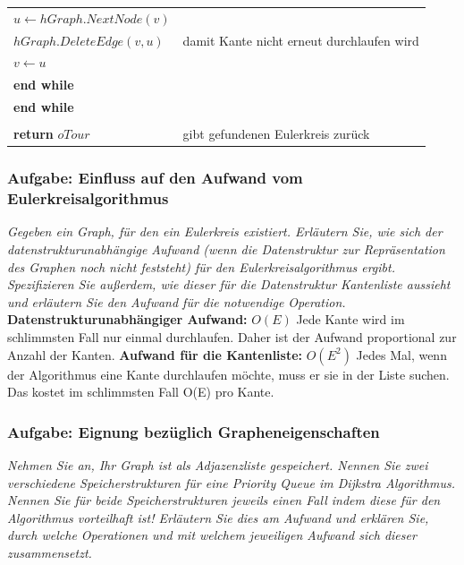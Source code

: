 \documentclass{article}
\begin{document}
\begin{algorithm}[H]
\begin{table}[H]
\begin{tabular}{p{6cm} p{9cm}}
        \setlength\parindent{24pt} $u \gets hGraph.NextNode(v)$ & \\
        \setlength\parindent{24pt} $hGraph.DeleteEdge(v, u)$ & damit Kante nicht erneut durchlaufen wird \\
        \setlength\parindent{24pt} $v \gets u$  & \\
        \setlength\parindent{12pt} \textbf{end while} & \\
        \textbf{end while} & \\
        & \\
        \textbf{return} $oTour$ & gibt gefundenen Eulerkreis zurück \\
    \end{tabular}
    \label{tab:Hierholzer-Algorithmus} 
\end{table}
\end{algorithm}


\newpage
\subsubsection{Aufgabe: Einfluss auf den Aufwand vom Eulerkreisalgorithmus \textcolor{ForestGreen}{\CheckmarkBold}}
\textit{Gegeben ein Graph, für den ein Eulerkreis existiert. Erläutern Sie, wie sich der datenstrukturunabhängige Aufwand (wenn die Datenstruktur zur Repräsentation des Graphen noch nicht feststeht) für den Eulerkreisalgorithmus  ergibt. Spezifizieren Sie außerdem, wie dieser für die Datenstruktur Kantenliste aussieht und erläutern Sie den Aufwand für die notwendige Operation.}\cite{hauptklausur21} \newline \newline 
\textbf{Datenstrukturunabhängiger Aufwand:} $O(E)$ \newline
Jede Kante wird im schlimmsten Fall nur einmal durchlaufen. Daher ist der Aufwand proportional zur Anzahl der Kanten. \newline
\textbf{Aufwand für die Kantenliste:} $O(E^2)$ \newline
Jedes Mal, wenn der Algorithmus eine Kante durchlaufen möchte, muss er sie in der Liste suchen. Das kostet im schlimmsten Fall O(E) pro Kante.
\newpage
\subsubsection{Aufgabe: Eignung bezüglich Grapheneigenschaften \textcolor{ForestGreen}{\CheckmarkBold}}
\textit{Nehmen Sie an, Ihr Graph ist als Adjazenzliste  gespeichert. Nennen Sie zwei verschiedene Speicherstrukturen für eine Priority Queue im Dijkstra Algorithmus. Nennen Sie für beide Speicherstrukturen jeweils einen Fall indem diese für den  Algorithmus vorteilhaft ist! Erläutern Sie dies am Aufwand und erklären Sie, durch welche Operationen und mit welchem jeweiligen Aufwand sich dieser zusammensetzt.} \cite{hauptklausur21} \newline 
\end{document}

